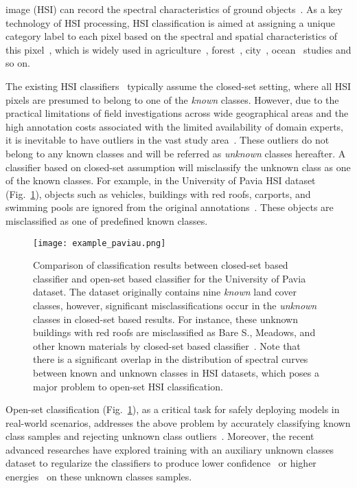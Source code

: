  image (HSI) can record the spectral characteristics of ground objects~\cite{6555921}. As a key technology of HSI processing, HSI classification is aimed at assigning a unique category label to each pixel based on the spectral and spatial characteristics of this pixel~\cite{FPGA,10078841,10696913,10167502}, which is widely used in agriculture~\cite{WHU-Hi}, forest~\cite{ITreeDet}, city~\cite{WANG2022113058}, ocean~\cite{WHU-Hi} studies and so on.

The existing HSI classifiers~\cite{FPGA,10325566,10047983,9573256} typically assume the closed-set setting, where all HSI pixels are presumed to belong to one of the \textit{known} classes. However, due to the practical limitations of field investigations across wide geographical areas and the high annotation costs associated with the limited availability of domain experts, it is inevitable to have outliers in the vast study area~\cite{MDL4OW,Fang_OpenSet,Kang_OpenSet}. These outliers do not belong to any known classes and will be referred as \textit{unknown} classes hereafter. A classifier based on closed-set assumption will misclassify the unknown class as one of the known classes. For example, in the University of Pavia HSI dataset (Fig.~\ref{fig:open_set_example}), objects such as vehicles, buildings with red roofs, carports, and swimming pools are ignored from the original annotations~\cite{MDL4OW}. These objects are misclassified as one of predefined known classes.

\begin{figure}[!t]
    \centering
    \texttt{[image: example\_paviau.png]}
    \caption{Comparison of classification results between closed-set based classifier and open-set based classifier for the University of Pavia dataset. The dataset originally contains nine \textit{known} land cover classes, however, significant misclassifications occur in the \textit{unknown} classes in closed-set based results. For instance, these unknown buildings with red roofs are misclassified as Bare S., Meadows, and other known materials by closed-set based classifier~\cite{FPGA}. Note that there is a significant overlap in the distribution of spectral curves between known and unknown classes in HSI datasets, which poses a major problem to open-set HSI classification.}
    \label{fig:open_set_example}
\end{figure}

Open-set classification (Fig.~\ref{fig:open_set_example}), as a critical task for safely deploying models in real-world scenarios, addresses the above problem by accurately classifying known class samples and rejecting unknown class outliers~\cite{OpenMax,MDL4OW,Fang_OpenSet}. Moreover, the recent advanced researches have explored training with an auxiliary unknown classes dataset to regularize the classifiers to produce lower confidence~\cite{Entropy,WOODS} or higher energies~\cite{Energy} on these unknown classes samples.

